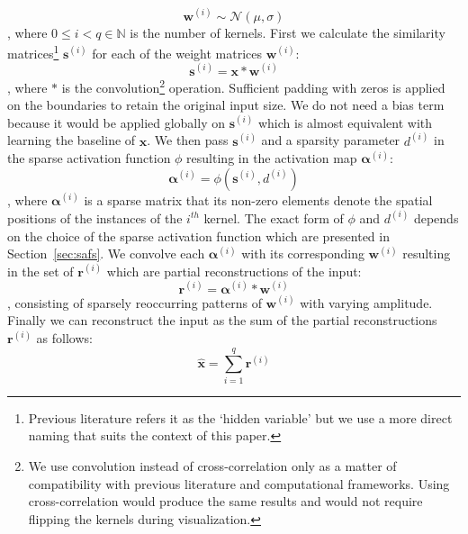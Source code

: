 \documentclass[journal]{IEEEtran}
\begin{document}
\begin{equation}
  \label{eq:weightinitialization}
  \bm{w}^{(i)} \sim \mathcal{N}(\mu, \sigma)
\end{equation}
\noindent
, where $0\le i < q \in \mathbb{N}$ is the number of kernels.
First we calculate the similarity matrices\footnote{Previous
  literature refers it as the `hidden variable' but we use a more
direct naming that suits the context of this paper.} $\bm{s}^{(i)}$
for each of the weight matrices $\bm{w}^{(i)}$:
\begin{equation}
  \label{eq:similarity}
  \bm{s}^{(i)} = \bm{x} * \bm{w}^{(i)}
\end{equation}
\noindent
, where $*$ is the convolution\footnote{We use convolution instead of
  cross-correlation only as a matter of compatibility with previous
  literature and computational frameworks. Using cross-correlation
  would produce the same results and would not require flipping the
kernels during visualization.} operation.
Sufficient padding with zeros is applied on the boundaries to retain
the original input size.
We do not need a bias term because it would be applied globally on
$\bm{s}^{(i)}$ which is almost equivalent with learning the baseline
of $\bm{x}$.
We then pass $\bm{s}^{(i)}$ and a sparsity parameter $d^{(i)}$ in the
sparse activation function $\phi$ resulting in the activation map
$\bm{\alpha}^{(i)}$:
\begin{equation}
  \label{eq:extrema}
  \bm{\alpha}^{(i)} = \phi(\bm{s}^{(i)}, d^{(i)})
\end{equation}
\noindent
, where $\bm{\alpha}^{(i)}$ is a sparse matrix that its non-zero
elements denote the spatial positions of the instances of the $i^{th}$ kernel.
The exact form of $\phi$ and $d^{(i)}$ depends on the choice of the
sparse activation function which are presented in Section~\ref{sec:safs}.
We convolve each $\bm{\alpha}^{(i)}$ with its corresponding
$\bm{w}^{(i)}$ resulting in the set of $\bm{r}^{(i)}$ which are
partial reconstructions of the input:
\begin{equation}
  \label{eq:reconstructions}
  \bm{r}^{(i)} = \bm{\alpha}^{(i)} * \bm{w}^{(i)}
\end{equation}
\noindent
, consisting of sparsely reoccurring patterns of $\bm{w}^{(i)}$ with
varying amplitude.
Finally we can reconstruct the input as the sum of the partial
reconstructions $\bm{r}^{(i)}$ as follows:
\begin{equation}
  \label{eq:output1}
  \hat{\bm{x}} = \sum\limits_{i=1}^q \bm{r}^{(i)}
\end{equation}
\end{document}
